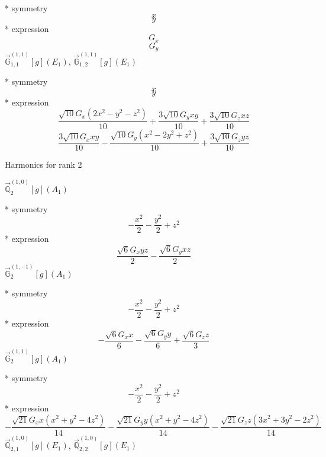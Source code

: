 \documentclass[fleqn,8pt]{jsarticle}
\begin{document}
\noindent\quad ** symmetry
\begin{dmath*}
x
\end{dmath*}
\begin{dmath*}
y
\end{dmath*}
\noindent\quad ** expression
\begin{dmath*}
G_{x}
\end{dmath*}
\begin{dmath*}
G_{y}
\end{dmath*}
\noindent\quad $\vec{\mathbb{G}}_{1,1}^{(1,1)}[g](E_{1})$, $\vec{\mathbb{G}}_{1,2}^{(1,1)}[g](E_{1})$

\noindent\quad ** symmetry
\begin{dmath*}
x
\end{dmath*}
\begin{dmath*}
y
\end{dmath*}
\noindent\quad ** expression
\begin{dmath*}
\frac{\sqrt{10} G_{x} \left(2 x^{2} - y^{2} - z^{2}\right)}{10} + \frac{3 \sqrt{10} G_{y} x y}{10} + \frac{3 \sqrt{10} G_{z} x z}{10}
\end{dmath*}
\begin{dmath*}
\frac{3 \sqrt{10} G_{x} x y}{10} - \frac{\sqrt{10} G_{y} \left(x^{2} - 2 y^{2} + z^{2}\right)}{10} + \frac{3 \sqrt{10} G_{z} y z}{10}
\end{dmath*}

\noindent * Harmonics for rank 2

\noindent\quad $\vec{\mathbb{Q}}_{2}^{(1,0)}[g](A_{1})$

\noindent\quad ** symmetry
\begin{dmath*}
- \frac{x^{2}}{2} - \frac{y^{2}}{2} + z^{2}
\end{dmath*}
\noindent\quad ** expression
\begin{dmath*}
\frac{\sqrt{6} G_{x} y z}{2} - \frac{\sqrt{6} G_{y} x z}{2}
\end{dmath*}
\noindent\quad $\vec{\mathbb{G}}_{2}^{(1,-1)}[g](A_{1})$

\noindent\quad ** symmetry
\begin{dmath*}
- \frac{x^{2}}{2} - \frac{y^{2}}{2} + z^{2}
\end{dmath*}
\noindent\quad ** expression
\begin{dmath*}
- \frac{\sqrt{6} G_{x} x}{6} - \frac{\sqrt{6} G_{y} y}{6} + \frac{\sqrt{6} G_{z} z}{3}
\end{dmath*}
\noindent\quad $\vec{\mathbb{G}}_{2}^{(1,1)}[g](A_{1})$

\noindent\quad ** symmetry
\begin{dmath*}
- \frac{x^{2}}{2} - \frac{y^{2}}{2} + z^{2}
\end{dmath*}
\noindent\quad ** expression
\begin{dmath*}
- \frac{\sqrt{21} G_{x} x \left(x^{2} + y^{2} - 4 z^{2}\right)}{14} - \frac{\sqrt{21} G_{y} y \left(x^{2} + y^{2} - 4 z^{2}\right)}{14} - \frac{\sqrt{21} G_{z} z \left(3 x^{2} + 3 y^{2} - 2 z^{2}\right)}{14}
\end{dmath*}
\noindent\quad $\vec{\mathbb{Q}}_{2,1}^{(1,0)}[g](E_{1})$, $\vec{\mathbb{Q}}_{2,2}^{(1,0)}[g](E_{1})$
\end{document}
